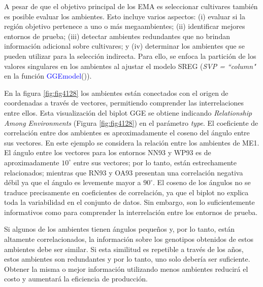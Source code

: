 A pesar de que el objetivo principal de los EMA es seleccionar cultivares también es posible evaluar los ambientes. Esto incluye varios aspectos: (i) evaluar si la región objetivo pertenece a uno o más megaambientes; (ii) identificar mejores entornos de prueba; (iii) detectar ambientes redundantes que no brindan información adicional sobre cultivares; y (iv) determinar los ambientes que se pueden utilizar para la selección indirecta. Para ello, se enfoca la partición de los valores singulares en los ambientes al ajustar el modelo SREG (\emph{SVP = ``column"} en la función \textcolor{blue}{GGEmodel}()). 

En la figura \ref{fig:fig4128} los ambientes están conectados con el origen de coordenadas a través de vectores, permitiendo comprender las interrelaciones entre ellos.  Esta visualización del biplot GGE se obtiene indicando \emph{Relationship Among Environments} (Figura \ref{fig:fig4128}) en el parámetro \emph{type}. El coeficiente de correlación entre dos ambientes es aproximadamente el coseno del ángulo entre sus vectores. 
En este ejemplo se considera la relación entre los ambientes de ME1. El ángulo entre los vectores para los entornos NN93 y WP93 es de aproximadamente $10^{\circ}$ entre sus vectores; por lo tanto, están estrechamente relacionados; mientras que RN93 y OA93 presentan una correlación negativa débil ya que el ángulo es levemente mayor a $90^{\circ}$. El coseno de los ángulos no se traduce precisamente en coeficientes de correlación, ya que el biplot no explica toda la variabilidad en el conjunto de datos. Sin embargo, son lo suficientemente informativos como para comprender la interrelación entre los entornos de prueba. 

Si algunos de los ambientes tienen ángulos pequeños y, por lo tanto, están altamente correlacionados, la información sobre los genotipos obtenidos de estos ambientes debe ser similar. Si esta similitud es repetible a través de los años, estos ambientes son redundantes y por lo tanto, uno solo debería ser suficiente. Obtener la misma o mejor información utilizando menos ambientes reducirá el costo y aumentará la eficiencia de producción.


